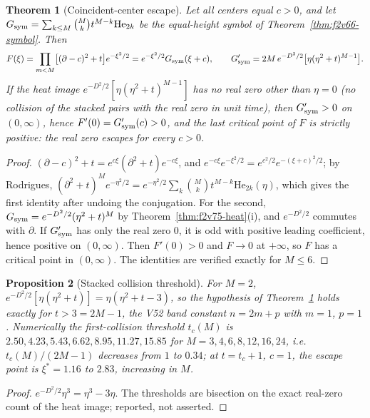 \documentclass[11pt]{article}
\newtheorem{theorem}{Theorem}[section]
\newtheorem{proposition}[theorem]{Proposition}
\theoremstyle{definition}
\theoremstyle{remark}
\begin{document}
\begin{theorem}[Coincident-center escape]
\label{thm:f2v78-coincident}
Let all centers equal \(c>0\), and let
\(G_{\rm sym}=\sum_{k\le M}\binom Mkt^{M-k}\mathrm{He}_{2k}\) be the
equal-height symbol of Theorem~\ref{thm:f2v66-symbol}.  Then
\begin{equation}
 F(\xi)=\prod_{m<M}\bigl[(\partial-c)^2+t\bigr]e^{-\xi^2/2}=e^{-\xi^2/2}G_{\rm sym}(\xi+c),
 \qquad
 G_{\rm sym}'=2M\,e^{-D^2/2}\bigl[\eta(\eta^2+t)^{M-1}\bigr].
 \label{eq:f2v78-coincident}
\end{equation}
If the heat image \(e^{-D^2/2}[\eta(\eta^2+t)^{M-1}]\) has no real zero
other than \(\eta=0\) (no collision of the stacked pairs with the real
zero in unit time), then \(G_{\rm sym}'>0\) on \((0,\infty)\), hence
\(F'(0)=G_{\rm sym}'(c)>0\), and the last critical point of \(F\) is
strictly positive: the real zero escapes for every \(c>0\).
\end{theorem}

\begin{proof}
\((\partial-c)^2+t=e^{c\xi}(\partial^2+t)e^{-c\xi}\), and
\(e^{-c\xi}e^{-\xi^2/2}=e^{c^2/2}e^{-(\xi+c)^2/2}\); by Rodrigues,
\((\partial^2+t)^Me^{-\eta^2/2}=e^{-\eta^2/2}\sum_k\binom Mkt^{M-k}\mathrm{He}_{2k}(\eta)\),
which gives the first identity after undoing the conjugation.  For the
second, \(G_{\rm sym}=e^{-D^2/2}(\eta^2+t)^M\) by
Theorem~\ref{thm:f2v75-heat}(i), and \(e^{-D^2/2}\) commutes with
\(\partial\).  If \(G_{\rm sym}'\) has only the real zero \(0\), it is
odd with positive leading coefficient, hence positive on \((0,\infty)\).
Then \(F'(0)>0\) and \(F\to0\) at \(+\infty\), so \(F\) has a critical
point in \((0,\infty)\).  The identities are verified exactly for
\(M\le6\).
\end{proof}

\begin{proposition}[Stacked collision threshold]
\label{prop:f2v78-threshold}
For \(M=2\), \(e^{-D^2/2}[\eta(\eta^2+t)]=\eta(\eta^2+t-3)\), so the
hypothesis of Theorem~\ref{thm:f2v78-coincident} holds exactly for
\(t>3=2M-1\), the V52 band constant \(n=2m+p\) with \(m=1\), \(p=1\).
Numerically the first-collision threshold \(t_c(M)\) is
\(2.50,4.23,5.43,6.62,8.95,11.27,15.85\) for \(M=3,4,6,8,12,16,24\),
i.e.\ \(t_c(M)/(2M-1)\) decreases from \(1\) to \(0.34\); at
\(t=t_c+1\), \(c=1\), the escape point is \(\xi^*=1.16\) to \(2.83\),
increasing in \(M\).
\end{proposition}

\begin{proof}
\(e^{-D^2/2}\eta^3=\eta^3-3\eta\).  The thresholds are bisection on the
exact real-zero count of the heat image; reported, not asserted.
\end{proof}
\end{document}
